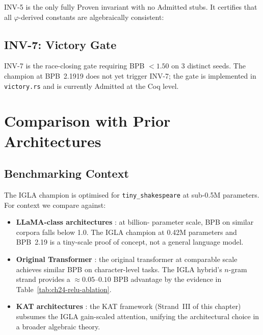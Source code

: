 INV-5 is the only fully Proven invariant with no Admitted stubs.  It certifies
that all $\varphi$-derived constants are algebraically consistent:


\subsection{INV-7: Victory Gate}
\label{subsec:ch24-inv7}

INV-7 is the race-closing gate requiring BPB $< 1.50$ on 3 distinct seeds.
The champion at BPB~2.1919 does not yet trigger INV-7; the gate is implemented
in \texttt{victory.rs} \cite{trios_victory_rs} and is currently Admitted at
the Coq level.


\section{Comparison with Prior Architectures}
\label{sec:ch24-comparison}

\subsection{Benchmarking Context}
\label{subsec:ch24-benchmark-context}

The IGLA champion is optimised for \texttt{tiny\_shakespeare} at sub-0.5M
parameters.  For context we compare against:

\begin{itemize}
  \item \textbf{LLaMA-class architectures} \cite{touvron_llama}: at billion-
        parameter scale, BPB on similar corpora falls below 1.0.  The IGLA
        champion at 0.42M parameters and BPB~2.19 is a tiny-scale proof of
        concept, not a general language model.
  \item \textbf{Original Transformer} \cite{vaswani_attention}: the original
        transformer at comparable scale achieves similar BPB on character-level
        tasks.  The IGLA hybrid's $n$-gram strand provides a $\approx 0.05$--$0.10$
        BPB advantage by the evidence in Table~\ref{tab:ch24-relu-ablation}.
  \item \textbf{KAT architectures} \cite{yang2024kat_kernel_attn}: the KAT
        framework (Strand~III of this chapter) subsumes the IGLA gain-scaled
        attention, unifying the architectural choice in a broader algebraic
        theory.
\end{itemize}

